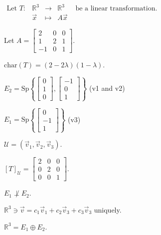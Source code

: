 \documentclass[11pt,fleqn]{book} %
\begin{document}
\begin{example}
{~~~}

    $\begin{matrix} \text{Let }T: &\mathbb{R}^3 &\to &\mathbb{R}^3 &\text{ be a linear transformation. }\\ &\vec{x} &\mapsto &A\vec{x} \end{matrix}$

    Let $A = \begin{bmatrix} 2 &0 &0 \\ 1 &2 &1 \\ -1 &0 &1 \end{bmatrix}$.

    $\mathrm{char}(T) = (2 - 2\lambda)(1 - \lambda)$.

    $E_2 = \mathrm{Sp}\left\{ \begin{bmatrix} 0 \\ 1 \\ 0 \end{bmatrix}, \begin{bmatrix} -1 \\ 0 \\ 1 \end{bmatrix} \right\}$ (v1 and v2)

    $E_1 = \mathrm{Sp}\left\{ \begin{bmatrix} 0 \\ -1 \\ 1 \end{bmatrix} \right\}$ (v3)

    $\mathcal{U} = (\vec{v}_1, \vec{v}_2, \vec{v}_3)$.

    $[T]_\mathcal{U} = \begin{bmatrix} 2 &0 &0 \\ 0 &2 &0 \\ 0 &0 &1\end{bmatrix}$.


    $E_1 \not\perp E_2$.

    $\mathbb{R}^3 \ni \vec{v} = c_1\vec{v}_1 + c_2\vec{v}_3 + c_3\vec{v}_3$ uniquely.

    $\mathbb{R}^3 = E_1 \oplus E_2$.
\end{example}
\end{document}
